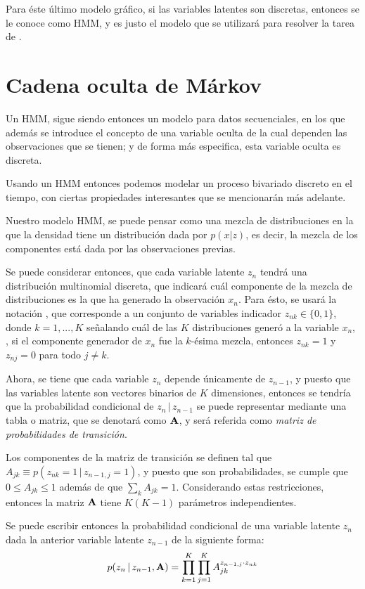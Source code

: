 Para éste último modelo gráfico, si las variables latentes son discretas, entonces se le conoce como \acf{HMM}, y es justo el modelo que se utilizará para resolver la tarea de \sd.

\section{Cadena oculta de Márkov}

Un \acl{HMM}, sigue siendo entonces un modelo para datos secuenciales, en los que además se introduce el concepto de una variable oculta de la cual dependen las observaciones que se tienen; y de forma más especifica, esta variable oculta es discreta. 

Usando un \ac{HMM} entonces podemos modelar un proceso bivariado discreto en el tiempo, con ciertas propiedades interesantes que se mencionarán más adelante.

Nuestro modelo \ac{HMM}, se puede pensar como una mezcla de distribuciones en la que la densidad tiene un distribución dada por $p(x|z)$, es decir, la mezcla de los componentes está dada por las observaciones previas.

Se puede considerar entonces, que cada variable latente $z_n$ tendrá una distribución multinomial discreta, que indicará cuál componente de la mezcla de distribuciones es la que ha generado la observación $x_n$. Para ésto, se usará la notación \unk, que corresponde a un conjunto de variables indicador $z_{nk} \in \lbrace 0, 1 \rbrace$, donde $k = 1, ..., K$ señalando cuál de las $K$ distribuciones generó a la variable $x_n$, \ie, si el componente generador de $x_n$ fue la $k$-ésima mezcla, entonces $z_{nk} = 1$ y $z_{nj} = 0$ para todo $j \neq k$.

Ahora, se tiene que cada variable $z_n$ depende únicamente de $z_{n-1}$, y puesto que las variables latente son vectores binarios de $K$ dimensiones, entonces se tendría que la probabilidad condicional de $z_n \,|\, z_{n-1}$ se puede representar mediante una tabla o matriz, que se denotará como $\textbf{A}$, y será referida como \textit{matriz de probabilidades de transición}. 

Los componentes de la matriz de transición se definen tal que $A_{jk} \equiv p(z_{nk} = 1 \,|\,  z_{n-1, j} = 1)$, y puesto que son probabilidades, se cumple que $0 \leq A_{jk} \leq 1$ además de que $\sum_k A_{jk} = 1$. Considerando estas restricciones, entonces la matriz $\textbf{A}$ tiene $K (K-1)$ parámetros independientes.

Se puede escribir entonces la probabilidad condicional de una variable latente $z_n$ dada la anterior variable latente $z_{n-1}$ de la siguiente forma: 
\begin{equation}
\label{eqn:2-8}
p(z_n \,|\, z_{n-1}, \textbf{A}) = \prod_{k=1}^K \prod_{j=1}^K A_{jk}^{z_{n-1, j} 
        \cdot z_{nk}}
\end{equation}

